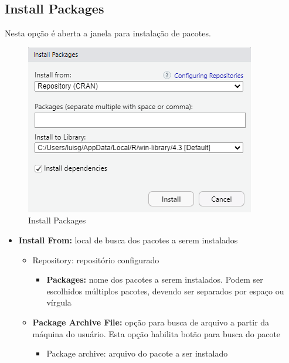 \documentclass[
  letterpaper,
  DIV=11,
  numbers=noendperiod]{scrreprt}
\providecommand{\tightlist}{%
  \setlength{\itemsep}{0pt}\setlength{\parskip}{0pt}}\usepackage{longtable,booktabs,array}
\begin{document}
\hypertarget{install-packages}{%
\subsection{Install Packages}\label{install-packages}}

Nesta opção é aberta a janela para instalação de pacotes.

\begin{figure}

{\centering \includegraphics{./images/rstudio/menu_tools_inst_pkgs.png}

}

\caption{\label{fig-rstudio-menu-inst-pkgs}Install Packages}

\end{figure}

\begin{itemize}
\item
  \textbf{Install From:} local de busca dos pacotes a serem instalados

  \begin{itemize}
  \item
    Repository: repositório configurado

    \begin{itemize}
    \tightlist
    \item
      \textbf{Packages:} nome dos pacotes a serem instalados. Podem ser
      escolhidos múltiplos pacotes, devendo ser separados por espaço ou
      vírgula
    \end{itemize}
  \item
    \textbf{Package Archive File:} opção para busca de arquivo a partir
    da máquina do usuário. Esta opção habilita botão para busca do
    pacote

    \begin{itemize}
    \tightlist
    \item
      Package archive: arquivo do pacote a ser instalado
    \end{itemize}
  \end{itemize}
\end{itemize}
\end{document}
